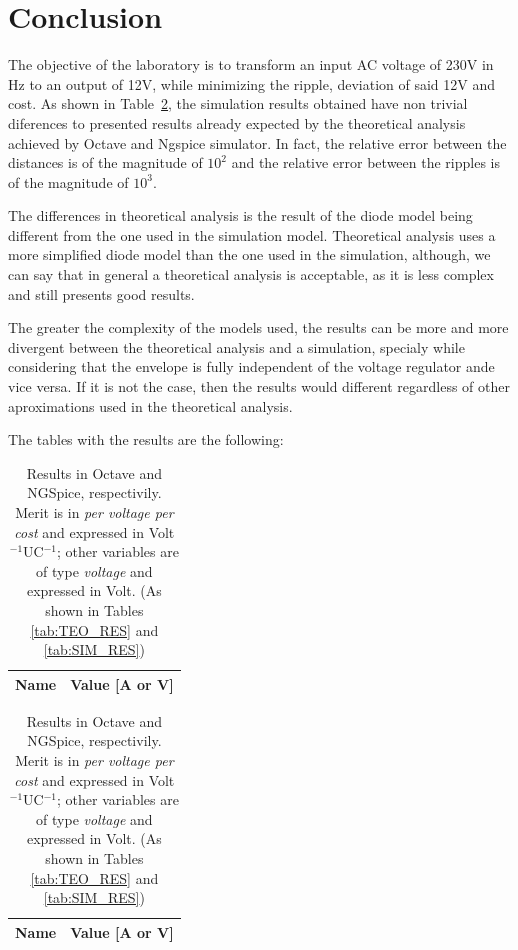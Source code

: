 \section{Conclusion}
\label{sec:conclusion}

The objective of the laboratory is to transform an input AC voltage of 230V in Hz to an output of 12V, while minimizing the ripple, deviation of said 12V and cost. As shown in Table~\ref{tab:CONCLUSAO}, the simulation results obtained have non trivial diferences to presented results already expected by the theoretical analysis achieved by Octave and Ngspice simulator. In fact, the relative error between the distances is of the magnitude of $10^2$ and the relative error between the ripples is of the magnitude of $10^3$.

The differences in theoretical analysis is the result of the diode model being different from the one used in the simulation model. Theoretical analysis uses a more simplified diode model than the one used in the simulation, although, we can say that in general a theoretical analysis is acceptable, as it is less complex and still presents good results.

The greater the complexity of the models used, the results can be more and more divergent between the theoretical analysis and a simulation, specialy while considering that the envelope is fully independent of the voltage regulator ande vice versa. If it is not the case, then the results would different regardless of other aproximations used in the theoretical analysis.

The tables with the results are the following:

\begin{table}[h]
\centering
\begin{minipage}[t]{0.33\linewidth}
 	 \begin{tabular}[t]{|l|r|}
 	   \hline    
 	   {\bf Name} & {\bf Value [A or V]} \\ \hline
 	   
 	 \end{tabular}
 	 \label{tab:TEO_CONCLUSAO}
\end{minipage}
\begin{minipage}[t]{0.33\linewidth}
  		\begin{tabular}[t]{|l|r|}
    	\hline    
   		{\bf Name} & {\bf Value [A or V]} \\ \hline
    	
  		\end{tabular}
  	\label{tab:SIM_CONCLUSAO}
\end{minipage}
  	\caption{Results in Octave and NGSpice, respectivily. Merit is in {\it per voltage per cost} and expressed in Volt$^{-1}$UC$^{-1}$; other variables are of type {\it voltage} and expressed in Volt. (As shown in Tables \ref{tab:TEO_RES} and \ref{tab:SIM_RES})}
  	\label{tab:CONCLUSAO}
\end{table}

